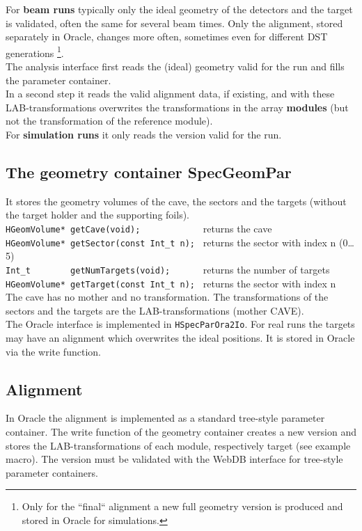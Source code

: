 For \textbf{beam runs} typically only the ideal geometry of the detectors and the target is validated, often the same 
for several beam times. Only the alignment, stored separately in Oracle, changes more often, sometimes even for different 
DST generations 
\footnote{Only for the ``final`` alignment a new full geometry version is produced and stored in Oracle for simulations.}.\\
The analysis interface first reads the (ideal) geometry valid for the run and fills the parameter container.\\
In a second step it reads the valid alignment data, if existing, and with these LAB-transformations overwrites the 
transformations in the array \textbf{modules} (but not the transformation of the reference module).\\

For \textbf{simulation runs} it only reads the version valid for the run.


\subsection[The geometry container SpecGeomPar]{The geometry container SpecGeomPar}

It stores the geometry volumes of the cave, the sectors and the targets (without the target holder and the supporting foils).\\
\verb+HGeomVolume* getCave(void);            + returns the cave\\
\verb+HGeomVolume* getSector(const Int_t n); + returns the sector with index n (0\ldots5)\\
\verb+Int_t        getNumTargets(void);      + returns the number of targets\\
\verb+HGeomVolume* getTarget(const Int_t n); + returns the sector with index n\\
The cave has no mother and no transformation. The transformations of the sectors and the targets are the LAB-transformations 
(mother CAVE).\\
The Oracle interface is implemented in \verb+HSpecParOra2Io+. For real runs the targets may have an alignment which overwrites 
the ideal positions. It is stored in Oracle via the write function.


\subsection[Alignment]{Alignment}

In Oracle the alignment is implemented as a standard tree-style parameter container. The write function of the geometry  
container creates a new version and stores the LAB-transformations of each module, respectively target (see example macro). 
The version must be validated with the WebDB interface for tree-style parameter containers.

